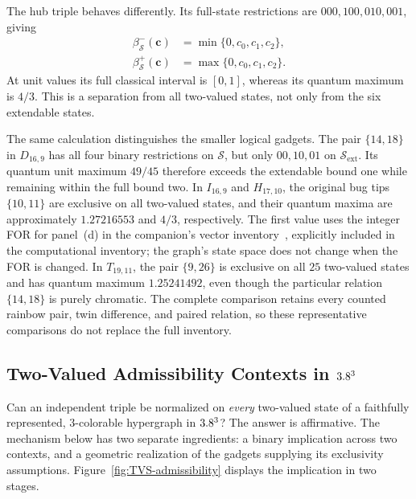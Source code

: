 \documentclass[aps,pra,reprint,superscriptaddress,longbibliography,nofootinbib,floatfix,10pt]{revtex4-2}
\theoremstyle{definition}\newtheorem{definition}[theorem]{Definition}
\theoremstyle{remark}\newtheorem{remark}[theorem]{Remark}
\newcommand{\Sc}{\mathcal S}\newcommand{\Cc}{\mathcal C}\newcommand{\Wc}{\mathcal W}
\begin{document}
The hub triple behaves differently. Its full-state restrictions are $000,100,010,001$, giving
\begin{equation}\label{eq:classical-hub-envelope}
\begin{aligned}
\beta^-_{\Sc}(\mathbf c)&=\min\{0,c_0,c_1,c_2\},\\
\beta^+_{\Sc}(\mathbf c)&=\max\{0,c_0,c_1,c_2\}.
\end{aligned}
\end{equation}
At unit values its full classical interval is $[0,1]$, whereas its quantum maximum is $4/3$. This is a separation from all two-valued states, not only from the six extendable states.

The same calculation distinguishes the smaller logical gadgets. The pair $\{14,18\}$ in $D_{16,9}$ has all four binary restrictions on $\Sc$, but only $00,10,01$ on $\Sc_{\mathrm{ext}}$. Its quantum unit maximum $49/45$ therefore exceeds the extendable bound one while remaining within the full bound two. In $I_{16,9}$ and $H_{17,10}$, the original bug tips $\{10,11\}$ are exclusive on all two-valued states, and their quantum maxima are approximately $1.27216553$ and $4/3$, respectively. The first value uses the integer FOR for panel~(d) in the companion's vector inventory~\cite{supplement}, explicitly included in the computational inventory; the graph's state space does not change when the FOR is changed. In $T_{19,11}$, the pair $\{9,26\}$ is exclusive on all $25$ two-valued states and has quantum maximum $1.25241492$, even though the particular relation $\{14,18\}$ is purely chromatic. The complete comparison retains every counted rainbow pair, twin difference, and paired relation, so these representative comparisons do not replace the full inventory.

\subsection{Two-Valued Admissibility Contexts in \texorpdfstring{$3.8^3$}{R3}}\label{sec:tvs-admissibility}

Can an independent triple be normalized on \emph{every} two-valued state of a faithfully represented, $3$-colorable hypergraph in $3.8^3$? The answer is affirmative. The mechanism below has two separate ingredients: a binary implication across two contexts, and a geometric realization of the gadgets supplying its exclusivity assumptions. Figure~\ref{fig:TVS-admissibility} displays the implication in two stages.
\end{document}
